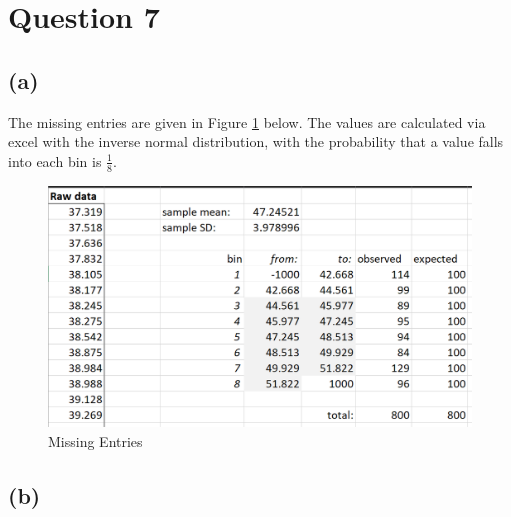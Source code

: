 \documentclass[12pt]{article}
\begin{document}
\newpage

\section*{Question 7}


\subsection*{(a)}

The missing entries are given in Figure \ref{fig:7-excel} below. The values are calculated via excel with the inverse normal distribution, with the probability that a value falls into each bin is $\frac{1}{8}$.


\begin{figure}[H]
    \centering
    \includegraphics[width=\textwidth]{Images/Q7.png}
    \caption{Missing Entries}
    \label{fig:7-excel}
\end{figure} 

\newpage

\subsection*{(b)}
\end{document}
